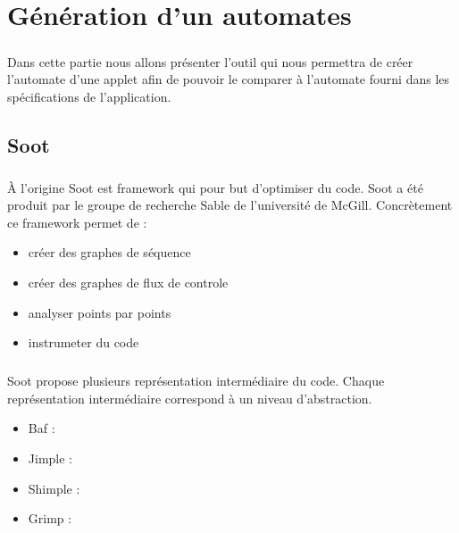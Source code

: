 \chapter{Génération d'un automates}

\paragraph{}
Dans cette partie nous allons présenter l'outil qui nous permettra de créer l'automate d'une applet afin de pouvoir le comparer à l'automate fourni dans les spécifications de l'application.

\section{Soot}

\paragraph{}
À l'origine Soot est framework qui pour but d'optimiser du code. Soot a été produit par le groupe de recherche Sable de l'université de McGill. Concrètement ce framework permet de :

\begin{itemize}
	\item créer des graphes de séquence
	\item créer des graphes de flux de controle
	\item analyser points par points
	\item instrumeter du code
\end{itemize}

\paragraph{}
Soot propose plusieurs représentation intermédiaire du code. Chaque représentation intermédiaire correspond à un niveau d'abstraction.
\begin{itemize}
	\item Baf :
	\item Jimple :
	\item Shimple : 
	\item Grimp :
\end{itemize}


\section{}

\paragraph{}